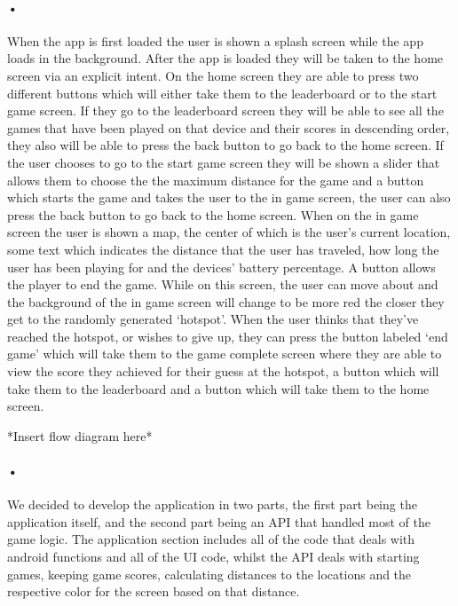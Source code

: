 \documentclass[10pt, a4paper]{article}
\begin{document}
\paragraph{•}
When the app is first loaded the user is shown a splash screen while the app loads in the background. After the app is loaded they will be taken to the home screen via an explicit intent. On the home screen they are able to press two different buttons which will either take them to the leaderboard or to the start game screen. If they go to the leaderboard screen they will be able to see all the games that have been played on that device and their scores in descending order, they also will be able to press the back button to go back to the home screen. If the user chooses to go to the start game screen they will be shown a slider that allows them to choose the the maximum distance for the game and a button which starts the game and takes the user to the in game screen, the user can also press the back button to go back to the home screen. When on the in game screen the user is shown a map, the center of which is the user's current location, some text which indicates the distance that the user has traveled, how long the user has been playing for and the devices' battery percentage. A button allows the player to end the game. While on this screen, the user can move about and the background of the in game screen will change to be more red the closer they get to the randomly generated `hotspot'. When the user thinks that they've reached the hotspot, or wishes to give up, they can press the button labeled `end game' which will take them to the game complete screen where they are able to view the score they achieved for their guess at the hotspot, a button which will take them to the leaderboard and a button which will take them to the home screen.

*Insert flow diagram here*

\paragraph*{•}
We decided to develop the application in two parts, the first part being the application itself, and the second part being an API that handled most of the game logic. The application section includes all of the code that deals with android functions and all of the UI code, whilst the API deals with starting games, keeping game scores, calculating distances to the locations and the respective color for the screen based on that distance.
\end{document}
